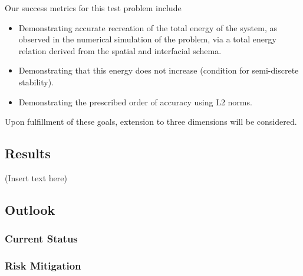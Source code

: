Our success metrics for this test problem include
\begin{itemize}
\item{Demonstrating accurate recreation of the total energy of the system, as observed in the numerical simulation of the problem, via a total energy relation derived from the
spatial and interfacial schema.}
\item{Demonstrating that this energy does not increase (condition for semi-discrete stability).}
\item{Demonstrating the prescribed order of accuracy using L2 norms.}
\end{itemize}

Upon fulfillment of these goals, extension to three dimensions will be considered.

\subsection{Results}
(Insert text here)

\subsection{Outlook}

\subsubsection{Current Status}

\subsubsection{Risk Mitigation}


